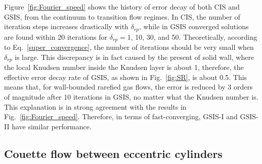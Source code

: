 Figure~\ref{fig:Fourier_speed} shows the history of error decay of both CIS and GSIS, from the continuum  to transition flow regimes. In CIS, the number of iteration steps increases drastically with $\delta_{rp}$, while in GSIS converged solutions are found within 20 iterations for $\delta_{rp}=1$, 10, 30, and 50. Theoretically, according to Eq.~\eqref{super_convergence}, the number of iterations should be very small when $\delta_{rp}$ is large. This discrepancy is in fact caused by the present of solid wall, where the local Knudsen number inside the Knudsen layer is about 1, therefore, the effective error decay rate of GSIS, as shown in Fig.~\ref{fig:SR}, is about 0.5. This means that, for wall-bounded rarefied gas flows, the error is reduced by 3 orders of magnitude after 10 iterations in GSIS, no matter what the Knudsen number is. This explanation is in strong agreement with the results in Fig.~\ref{fig:Fourier_speed}. Therefore, in terms of fast-converging, GSIS-I and GSIS-II have similar performance. 










\subsection{Couette flow between eccentric cylinders}


